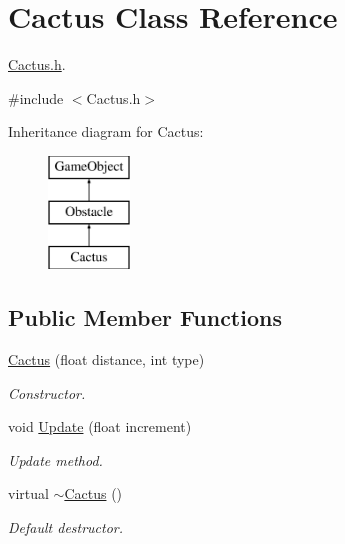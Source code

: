 \hypertarget{class_cactus}{}\section{Cactus Class Reference}
\label{class_cactus}


\mbox{\hyperlink{_cactus_8h_source}{Cactus.\+h}}.  




{\ttfamily \#include $<$Cactus.\+h$>$}

Inheritance diagram for Cactus\+:\begin{figure}[H]
\begin{center}
\leavevmode
\includegraphics[height=3.000000cm]{class_cactus}
\end{center}
\end{figure}
\subsection*{Public Member Functions}
\begin{DoxyCompactItemize}
\item 
\mbox{\hyperlink{class_cactus_a1db8ad82bbfb944cf480d84b55ebd837}{Cactus}} (float distance, int type)
\begin{DoxyCompactList}\small\item\em Constructor. \end{DoxyCompactList}\item 
void \mbox{\hyperlink{class_cactus_aa432a0a002a0027ca294813d11cb76f3}{Update}} (float increment)
\begin{DoxyCompactList}\small\item\em Update method. \end{DoxyCompactList}\item 
\mbox{\label{class_cactus_aad137061a9d2432ac47f4c28b23644c3}} 
virtual \mbox{\hyperlink{class_cactus_aad137061a9d2432ac47f4c28b23644c3}{$\sim$\+Cactus}} ()
\begin{DoxyCompactList}\small\item\em Default destructor. \end{DoxyCompactList}\end{DoxyCompactItemize}
